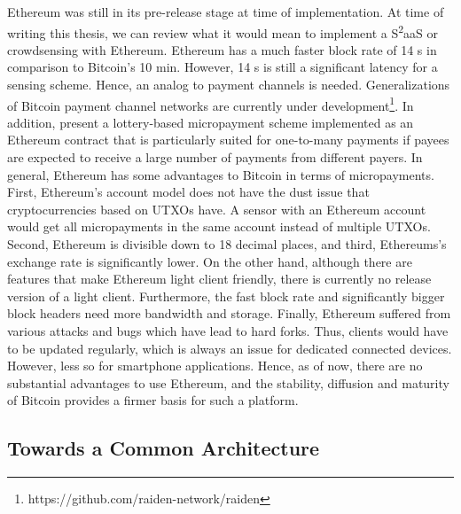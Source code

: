 Ethereum was still in its pre-release stage at time of implementation. At time of writing this thesis, we can review what it would mean to implement a S\textsuperscript{2}aaS or crowdsensing with Ethereum. Ethereum has a much faster block rate of 14 s in comparison to Bitcoin's 10 min. However, 14 s is still a significant latency for a sensing scheme. Hence, an analog to payment channels is needed. Generalizations of Bitcoin payment channel networks are currently under development\footnote{https://github.com/raiden-network/raiden}. In addition, \cite{golemnano2015} present a lottery-based micropayment scheme implemented as an Ethereum contract that is particularly suited for one-to-many payments if payees are expected to receive a large number of payments from different payers.
In general, Ethereum has some advantages to Bitcoin in terms of micropayments. First, Ethereum's account model does not have the dust issue that cryptocurrencies based on \ac{UTXO}s have. A sensor with an Ethereum account would get all micropayments in the same account instead of multiple \ac{UTXO}s. Second, Ethereum is divisible down to 18 decimal places, and third, Ethereums's exchange rate is significantly lower. On the other hand, although there are features that make Ethereum light client friendly, there is currently no release version of a light client. Furthermore, the fast block rate and significantly bigger block headers need more bandwidth and storage. Finally, Ethereum suffered from various attacks and bugs which have lead to hard forks. Thus, clients would have to be updated regularly, which is always an issue for dedicated connected devices. However, less so for smartphone applications.
Hence, as of now, there are no substantial advantages to use Ethereum, and the stability, diffusion and maturity of Bitcoin provides a firmer basis for such a platform.


\subsection{Towards a Common Architecture}

